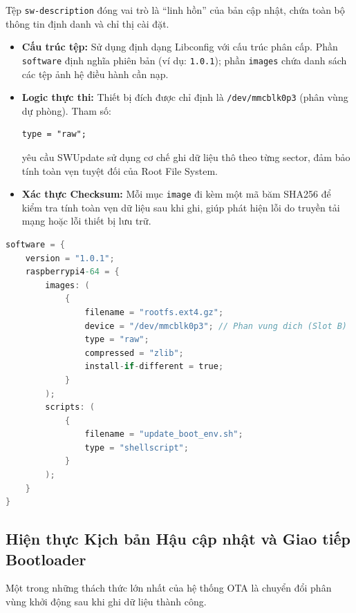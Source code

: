 Tệp \texttt{sw-description} đóng vai trò là ``linh hồn'' của bản cập nhật, chứa toàn bộ thông tin định danh và chỉ thị cài đặt.

\begin{itemize}
    \item \textbf{Cấu trúc tệp:} Sử dụng định dạng Libconfig với cấu trúc phân cấp. Phần \texttt{software} định nghĩa phiên bản (ví dụ: \texttt{1.0.1}); phần \texttt{images} chứa danh sách các tệp ảnh hệ điều hành cần nạp.

    \item \textbf{Logic thực thi:} Thiết bị đích được chỉ định là \texttt{/dev/mmcblk0p3} (phân vùng dự phòng). Tham số:
\begin{lstlisting}[style=thesisstyle]
type = "raw";
\end{lstlisting}
    yêu cầu SWUpdate sử dụng cơ chế ghi dữ liệu thô theo từng sector, đảm bảo tính toàn vẹn tuyệt đối của Root File System.

    \item \textbf{Xác thực Checksum:} Mỗi mục \texttt{image} đi kèm một mã băm SHA256 để kiểm tra tính toàn vẹn dữ liệu sau khi ghi, giúp phát hiện lỗi do truyền tải mạng hoặc lỗi thiết bị lưu trữ.
\end{itemize}
\begin{lstlisting}[style=thesisstyle, language=C]
software = {
    version = "1.0.1";
    raspberrypi4-64 = {
        images: (
            {
                filename = "rootfs.ext4.gz";
                device = "/dev/mmcblk0p3"; // Phan vung dich (Slot B)
                type = "raw";
                compressed = "zlib";
                install-if-different = true;
            }
        );
        scripts: (
            {
                filename = "update_boot_env.sh";
                type = "shellscript";
            }
        );
    }
}

\end{lstlisting}
\subsection{Hiện thực Kịch bản Hậu cập nhật và Giao tiếp Bootloader}

Một trong những thách thức lớn nhất của hệ thống OTA là chuyển đổi phân vùng khởi động sau khi ghi dữ liệu thành công.

